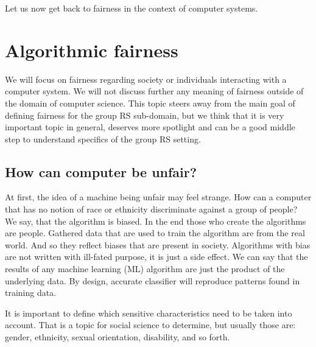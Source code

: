Let us now get back to fairness in the context of computer systems.









\section{Algorithmic fairness}\label{subsec:02_general.algorithmic_fairness_and_possible_meanings}
We will focus on fairness regarding society or individuals interacting with a computer system. We will not discuss further any meaning of fairness outside of the domain of computer science. This topic steers away from the main goal of defining fairness for the group RS sub-domain, but we think that it is very important topic in general, deserves more spotlight and can be a good middle step to understand specifics of the group RS setting.

\subsection{How can computer be unfair?}
At first, the idea of a machine being unfair may feel strange. How can a computer that has no notion of race or ethnicity discriminate against a group of people? We say, that the algorithm is biased. In the end those who create the algorithms are people. Gathered data that are used to train the algorithm are from the real world. And so they reflect biases that are present in society. Algorithms with bias are not written with ill-fated purpose, it is just a side effect. We can say that the results of any machine learning (ML) algorithm are just the product of the underlying data. By design, accurate classifier will reproduce patterns found in training data.

It is important to define which sensitive characteristics need to be taken into account. That is a topic for social science to determine, but usually those are: gender, ethnicity, sexual orientation, disability, and so forth.

